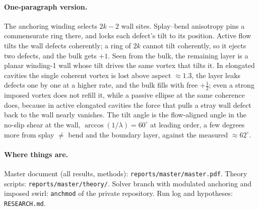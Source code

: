 \documentclass[11pt,a4paper]{article}
\newcommand{\half}{\tfrac12}
\begin{document}
\paragraph{One-paragraph version.} The anchoring winding selects $2k-2$ wall sites. Splay--bend anisotropy pins a commensurate ring there, and locks each defect's tilt to its
position. Active flow tilts the wall defects coherently; a ring of $2k$ cannot tilt coherently, so it ejects two defects, and the bulk gets $+1$. Seen from the bulk, the
remaining layer is a planar winding-1 wall whose tilt drives the same vortex that tilts it. In elongated cavities the single coherent vortex is lost above aspect $\approx1.3$,
the layer leaks defects one by one at a higher rate, and the bulk fills with free $+\half$; even a strong imposed vortex does not refill it, while a passive ellipse at the same coherence
does, because in active elongated cavities the force that pulls a stray wall defect back to the wall nearly vanishes. The tilt angle is the flow-aligned angle in the no-slip shear at the wall,
$\arccos(1/\lambda)=60^\circ$ at leading order, a few degrees more from splay $\neq$ bend and the boundary layer, against the measured $\approx62^\circ$.

\paragraph{Where things are.} Master document (all results, methods): \texttt{reports/master/master.pdf}. Theory scripts: \texttt{reports/master/theory/}.
Solver branch with modulated anchoring and imposed swirl: \texttt{anchmod} of the private repository. Run log and hypotheses: \texttt{RESEARCH.md}.
\end{document}
